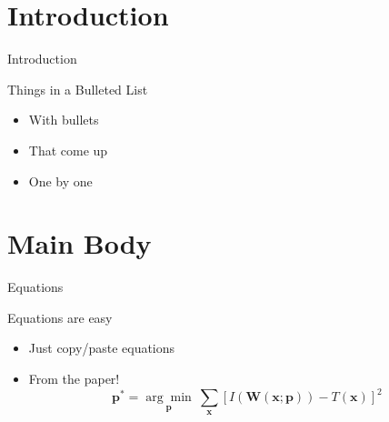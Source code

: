 \documentclass[a4paper, utf8, handout]{beamer}
\begin{document}
\begin{frame}[plain]
  \titlepage
\end{frame}


\section
  {Introduction}

\makeatletter
\begin{frame}
  {Introduction}

  {Things in a Bulleted List}

  \pause

  \begin{itemize}
  \item With bullets\pause
  \item That come up\pause
  \item One by one
  \end{itemize}
\end{frame}
\makeatother


\section
  {Main Body}

\begin{frame}
  {Equations}

  Equations are easy
  \begin{itemize}
  \item Just copy/paste equations\pause
  \item From the paper!
    \begin{equation*}
      \textbf{p}^* = \underset{\textbf{p}}{\arg\!\min}~\sum_{\textbf{x}}\left[ I(\textbf{W}(\textbf{x};\textbf{p})) - T(\textbf{x}) \right]^2
    \end{equation*}
  \end{itemize}
\end{frame}
\end{document}
